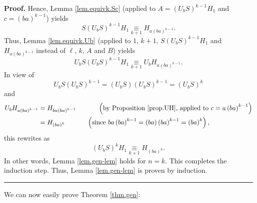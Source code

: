 \documentclass[numbers=enddot,12pt,final,onecolumn,notitlepage]{scrartcl}%
\theoremstyle{definition}
\newenvironment{proof}[1][Proof]{\noindent\textbf{#1.} }{\ \rule{0.5em}{0.5em}}
\begin{document}
\begin{proof}
Hence, Lemma \ref{lem.equivk.Sc} (applied to $A=\left(  U_{b}S\right)
^{k-1}H_{1}$ and $c=\left(  ba\right)  ^{k-1}$) yields
\[
S\left(  U_{b}S\right)  ^{k-1}H_{1}\underset{k+1}{\equiv}H_{a\left(
ba\right)  ^{k-1}}.
\]
Thus, Lemma \ref{lem.equivk.Ub} (applied to $1$, $k+1$, $S\left(
U_{b}S\right)  ^{k-1}H_{1}$ and $H_{a\left(  ba\right)  ^{k-1}}$ instead of
$\ell$, $k$, $A$ and $B$) yields%
\[
U_{b}S\left(  U_{b}S\right)  ^{k-1}H_{1}\underset{k+1}{\equiv}U_{b}H_{a\left(
ba\right)  ^{k-1}}.
\]
In view of%
\[
U_{b}S\left(  U_{b}S\right)  ^{k-1}=\left(  U_{b}S\right)  \left(
U_{b}S\right)  ^{k-1}=\left(  U_{b}S\right)  ^{k}%
\]
and%
\begin{align*}
U_{b}H_{a\left(  ba\right)  ^{k-1}}  &  =H_{ba\left(  ba\right)  ^{k-1}%
}\ \ \ \ \ \ \ \ \ \ \left(  \text{by Proposition \ref{prop.UH}, applied to
}c=a\left(  ba\right)  ^{k-1}\right) \\
&  =H_{\left(  ba\right)  ^{k}}\ \ \ \ \ \ \ \ \ \ \left(  \text{since
}ba\left(  ba\right)  ^{k-1}=\left(  ba\right)  \left(  ba\right)
^{k-1}=\left(  ba\right)  ^{k}\right)  ,
\end{align*}
this rewrites as
\[
\left(  U_{b}S\right)  ^{k}H_{1}\underset{k+1}{\equiv}H_{\left(  ba\right)
^{k}}.
\]
In other words, Lemma \ref{lem.gen-lem} holds for $n=k$. This completes the
induction step. Thus, Lemma \ref{lem.gen-lem} is proven by induction.
\end{proof}

We can now easily prove Theorem \ref{thm.gen}:
\end{document}

